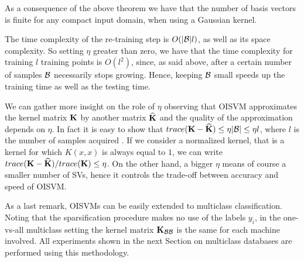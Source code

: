 As a consequence of the above theorem we have that the number of basis vectors
is finite for any compact input domain, when using a Gaussian kernel.

The time complexity of the re-training step is $O(|\mathcal{B}|l)$, as well as its space
complexity. So setting $\eta$ greater than zero, we have that the time
complexity for training $l$ training points is $O(l^2)$, since, as said above,
after a certain number of samples $\mathcal{B}$ necessarily stops growing.
Hence, keeping $\mathcal{B}$ small speeds up the training time as well as the testing time.


We can gather more insight on the role of $\eta$ observing that
OISVM approximates the kernel matrix $\mathbf{K}$ by another matrix $\widehat{\mathbf{K}}$
\cite{BachJordan2005} and the quality of the approximation depends on $\eta$.
In fact it is easy to show that $trace(\mathbf{K}-\widehat{\mathbf{K}}) \leq \eta |\mathcal{B}| \leq \eta l$, where $l$ is
the number of samples acquired \cite{EngelMM04}. If we consider a
normalized kernel, that is a kernel for which $K(x,x)$ is always equal
to $1$, we can write $trace(\mathbf{K}-\widehat{\mathbf{K}})/trace(\mathbf{K}) \leq \eta$. On
the other hand, a bigger $\eta$ means of course a smaller number of
SVs, hence it controls the trade-off between accuracy and speed of OISVM.

As a last remark, OISVMs can be easily extended to multiclass
classification. Noting that the sparsification procedure makes
no use of the labels $y_i$, in the one-vs-all
multiclass setting the kernel matrix $\mathbf{K}_{\mathcal{B}\mathcal{B}}$
is the same for each machine involved. All experiments shown in the next Section on multiclass databases
are performed using this methodology.
